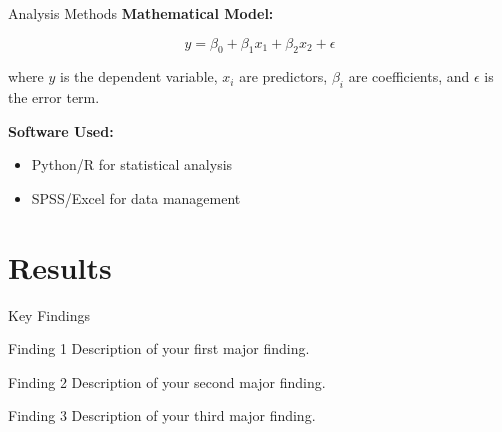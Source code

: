 \documentclass[aspectratio=169]{beamer}
\begin{document}
	\begin{frame}{Analysis Methods}
		\textbf{Mathematical Model:}
		
		\begin{equation}
			y = \beta_0 + \beta_1 x_1 + \beta_2 x_2 + \epsilon
		\end{equation}
		
		where $y$ is the dependent variable, $x_i$ are predictors, $\beta_i$ are coefficients, and $\epsilon$ is the error term.
		
		\vspace{1em}
		
		\textbf{Software Used:}
		\begin{itemize}
			\item Python/R for statistical analysis
			\item SPSS/Excel for data management
		\end{itemize}
	\end{frame}
	
	\section{Results}
	
	\begin{frame}{Key Findings}
		\begin{block}{Finding 1}
			Description of your first major finding.
		\end{block}
		
		\begin{block}{Finding 2}
			Description of your second major finding.
		\end{block}
		
		\begin{block}{Finding 3}
			Description of your third major finding.
		\end{block}
	\end{frame}
	
\end{document}
